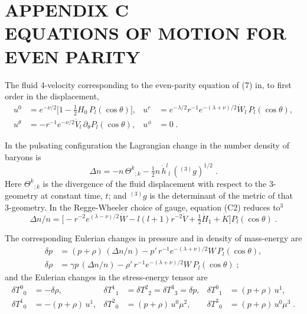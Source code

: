 
\appendix
\section*{APPENDIX C \\ EQUATIONS OF MOTION FOR EVEN PARITY}

The fluid 4-velocity corresponding to the even-parity equation of (7) in, to
first order in the displacement,
\begin{align}
u^{0} &= e^{-\nu/2}\bigl[1 - \tfrac{1}{2}H_{0}\,P_{l}(\cos\theta)\bigr] , &
u^{r} &= e^{-\lambda/2} r^{-1} e^{-(\lambda+\nu)/2} \dot{W}_{l}\,P_{l}(\cos\theta) ,
\nonumber\\
u^{\theta} &= -r^{-1} e^{-\nu/2} \dot{V}_{l}\,\partial_{\theta}P_{l}(\cos\theta) , &
u^{\phi} &= 0 \;.
\tag{C1}
\end{align}

In the pulsating configuration the Lagrangian change in the number density of baryons is
\begin{equation}
\Delta n = -n\,\Theta^{k}{}_{;k} - \tfrac{1}{2}n\,\dot{h}^{l}{}_{l}\,({}^{(3)}g)^{1/2} \;.
\tag{C2}
\end{equation}
Here $\Theta^{k}{}_{;k}$ is the divergence of the fluid displacement with respect to the 3-geometry at constant
time, $t$; and ${}^{(3)}g$ is the determinant of the metric of that 3-geometry.  In the Regge-Wheeler
choice of gauge, equation (C2) reduces to$^{3}$
\begin{equation}
\Delta n/n = \bigl[-r^{-2}e^{(\lambda-\nu)/2}\dot{W} - l(l+1)r^{-2}\dot{V}
             + \tfrac{1}{2}\dot{H}_{1} + \dot{K}\bigr]P_{l}(\cos\theta) \;.
\tag{C3}
\end{equation}

The corresponding Eulerian changes in pressure and in density of mass-energy are
\begin{align}
\delta p &= (p+\rho)\,(\Delta n/n) - p'\,r^{-1}e^{-(\lambda+\nu)/2}W\,P_{l}(\cos\theta) ,
\nonumber\\
\delta\rho &= \gamma p\,(\Delta n/n) - \rho'\,r^{-1}e^{-(\lambda+\nu)/2}W\,P_{l}(\cos\theta) \;;
\tag{C4}
\end{align}
and the Eulerian changes in the stress-energy tensor are
\begin{align}
\delta T^{0}{}_{0} &= -\delta\rho , &
\delta T^{1}{}_{1} &= \delta T^{2}{}_{2} = \delta T^{3}{}_{3} = \delta p , &
\delta T^{0}{}_{1} &= (p+\rho)\,u^{1} ,
\nonumber\\
\delta T^{1}{}_{0} &= -(p+\rho)\,u^{1} , &
\delta T^{2}{}_{0} &= (p+\rho)\,u^{0}\mu^{2} , &
\delta T^{3}{}_{0} &= (p+\rho)\,u^{0}\mu^{3} \;.
\tag{C5}
\end{align}

